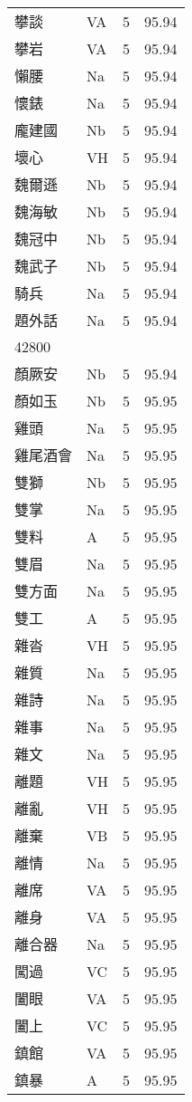 \documentclass[twocolumn]{book}
\begin{document}
\begin{supertabular}{llrr}
攀談 & VA & 5 &  95.94\\
攀岩 & VA & 5 &  95.94\\
懶腰 & Na & 5 &  95.94\\
懷錶 & Na & 5 &  95.94\\
龐建國 & Nb & 5 &  95.94\\
壞心 & VH & 5 &  95.94\\
魏爾遜 & Nb & 5 &  95.94\\
魏海敏 & Nb & 5 &  95.94\\
魏冠中 & Nb & 5 &  95.94\\
魏武子 & Nb & 5 &  95.94\\
騎兵 & Na & 5 &  95.94\\
題外話 & Na & 5 &  95.94\\
42800\\
顏厥安 & Nb & 5 &  95.94\\
顏如玉 & Nb & 5 &  95.95\\
雞頭 & Na & 5 &  95.95\\
雞尾酒會 & Na & 5 &  95.95\\
雙獅 & Nb & 5 &  95.95\\
雙掌 & Na & 5 &  95.95\\
雙料 & A & 5 &  95.95\\
雙眉 & Na & 5 &  95.95\\
雙方面 & Na & 5 &  95.95\\
雙工 & A & 5 &  95.95\\
雜沓 & VH & 5 &  95.95\\
雜質 & Na & 5 &  95.95\\
雜詩 & Na & 5 &  95.95\\
雜事 & Na & 5 &  95.95\\
雜文 & Na & 5 &  95.95\\
離題 & VH & 5 &  95.95\\
離亂 & VH & 5 &  95.95\\
離棄 & VB & 5 &  95.95\\
離情 & Na & 5 &  95.95\\
離席 & VA & 5 &  95.95\\
離身 & VA & 5 &  95.95\\
離合器 & Na & 5 &  95.95\\
闖過 & VC & 5 &  95.95\\
闔眼 & VA & 5 &  95.95\\
闔上 & VC & 5 &  95.95\\
鎮館 & VA & 5 &  95.95\\
鎮暴 & A & 5 &  95.95\\

\end{supertabular}
\end{document}

